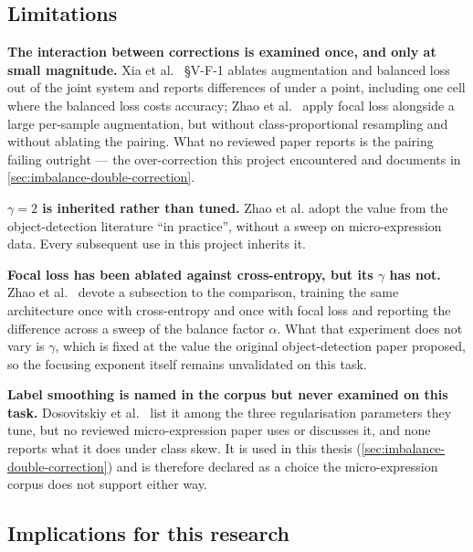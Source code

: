 \subsection{Limitations}
\label{sec:imbalance-limitations}

\textbf{The interaction between corrections is examined once, and only at small magnitude.} Xia et al.~\cite{xia2020a} \S V-F-1 ablates augmentation and balanced loss out of the joint system and reports differences of under a point, including one cell where the balanced loss costs accuracy; Zhao et al.~\cite{zhaoS2021} apply focal loss alongside a large per-sample augmentation, but without class-proportional resampling and without ablating the pairing. What no reviewed paper reports is the pairing failing outright --- the over-correction this project encountered and documents in \autoref{sec:imbalance-double-correction}.

\textbf{$\gamma = 2$ is inherited rather than tuned.} Zhao et al. adopt the value from the object-detection literature ``in practice'', without a sweep on micro-expression data. Every subsequent use in this project inherits it.

\textbf{Focal loss has been ablated against cross-entropy, but its $\gamma$ has not.} Zhao et al.~\cite{zhaoS2021} devote a subsection to the comparison, training the same architecture once with cross-entropy and once with focal loss and reporting the difference across a sweep of the balance factor $\alpha$. What that experiment does not vary is $\gamma$, which is fixed at the value the original object-detection paper proposed, so the focusing exponent itself remains unvalidated on this task.

\textbf{Label smoothing is named in the corpus but never examined on this task.} Dosovitskiy et al.~\cite{dosovitskiy2021} list it among the three regularisation parameters they tune, but no reviewed micro-expression paper uses or discusses it, and none reports what it does under class skew. It is used in this thesis (\autoref{sec:imbalance-double-correction}) and is therefore declared as a choice the micro-expression corpus does not support either way.

\subsection{Implications for this research}
\label{sec:imbalance-double-correction}

